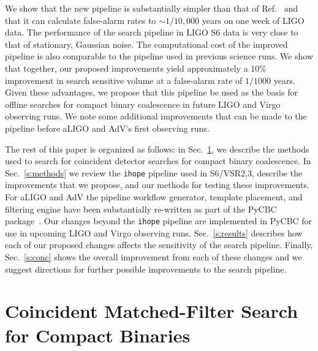\documentclass[12pt]{iopart} \usepackage{graphicx,amssymb}
\begin{document}
We show that the new pipeline is substantially simpler than that of
Ref.~\cite{Babak:2012zx} and that it can calculate false-alarm rates to $\sim
1/10,000$ years on one week of LIGO data. The performance of the search
pipeline in LIGO S6 data is very close to that of stationary, Gaussian noise.
The computational cost of the improved pipeline is also comparable to the
pipeline used in previous science runs. We show that together, our proposed
improvements yield approximately a 10\% improvement in search sensitive volume
at a false-alarm rate of $1/1000$ years. Given these advantages, we propose
that this pipeline be used as the basis for offline searches for compact
binary coalescence in future LIGO and Virgo observing runs.  We note some additional improvements
that can be made to the pipeline before aLIGO and AdV's first observing runs.

The rest of this paper is organized as follows: in Sec.~\ref{s:search}, we
describe the methods used to search for coincident
detector searches for compact binary coalescence. In Sec.~\ref{s:methods} we
review the \texttt{ihope} pipeline used in S6/VSR2,3, describe the
improvements that we propose, and our methods for testing these improvements.
For aLIGO and AdV the pipeline workflow generator, template placement, and
filtering engine have been substantially re-written as part of the PyCBC
package~\cite{Canton:2014ena}. Our changes beyond the \texttt{ihope}
pipeline are implemented in PyCBC for use in upcoming LIGO and Virgo observing
runs.  Sec.~\ref{s:results} describes how each of our proposed changes affects
the sensitivity of the search pipeline.  Finally, Sec.~\ref{s:conc} shows the
overall improvement from each of these changes and we suggest directions for
further possible improvements to the search pipeline.

\section{Coincident Matched-Filter Search for Compact Binaries}
\label{s:search}
\end{document}
